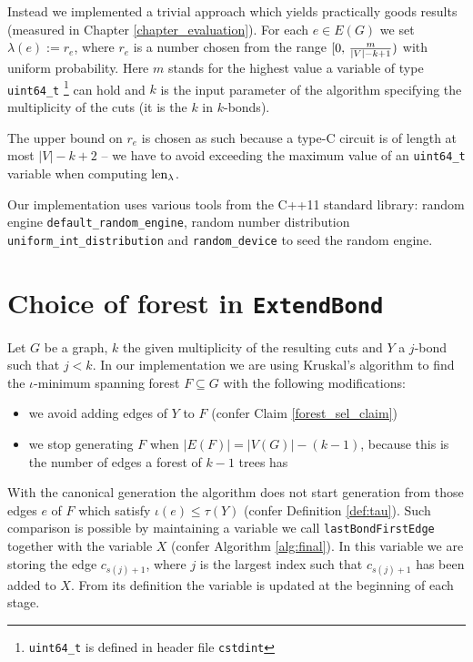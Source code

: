 Instead we implemented a trivial approach which yields practically goods results (measured in Chapter \ref{chapter_evaluation}). For each $e \in E(G)$ we set $\lambda(e) := r_e$, where $r_e$ is a number chosen from the range $[0, \, { {m}\over{|V| - k + 1} } )$ with uniform probability. Here $m$ stands for the highest value a variable of type \lstinline|uint64_t| \footnote{\lstinline|uint64_t| is defined in header file \lstinline|cstdint|} can hold and $k$ is the input parameter of the algorithm specifying the multiplicity of the cuts (it is the $k$ in $k$-bonds).

The upper bound on $r_e$ is chosen as such because a type-C circuit is of length at most $\lvert V \rvert - k + 2$ -- we have to avoid exceeding the maximum value of an \lstinline|uint64_t| variable when computing $\operatorname{len}_\lambda$.

Our implementation uses various tools from the C++11 standard library: random engine \lstinline|default_random_engine|, random number distribution \lstinline|uniform_int_distribution| and \lstinline|random_device| to seed the \linebreak random engine.


\section{Choice of forest in \lstinline|ExtendBond|}

Let $G$ be a graph, $k$ the given multiplicity of the resulting cuts and $Y$ a $j$-bond such that $j < k$. In our implementation we are using Kruskal's algorithm to find the $\iota$-minimum spanning forest $F \subseteq G$ with the following modifications:

\begin{itemize}
	\item we avoid adding edges of $Y$ to $F$ (confer Claim \ref{forest_sel_claim})
	\item we stop generating $F$ when $\lvert E(F) \rvert = |V(G)| - (k - 1)$, because this is the number of edges a forest of $k - 1$ trees has
\end{itemize}

With the canonical generation the algorithm does not start generation from those edges $e$ of $F$ which satisfy $\iota(e) \leq \tau(Y)$ (confer Definition \ref{def:tau}). Such comparison is possible by maintaining a variable we call \lstinline|lastBondFirstEdge| together with the variable $X$ (confer Algorithm \ref{alg:final}). In this variable we are storing the edge $c_{s(j)+1}$, where $j$ is the largest index such that $c_{s(j)+1}$ has been added to $X$. From its definition the variable is updated at the beginning of each stage.

